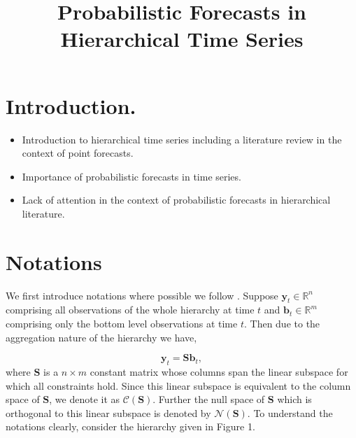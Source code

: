 \documentclass[a4paper, 11pt]{article}
\begin{document}
\title{Probabilistic Forecasts in Hierarchical Time Series}
\maketitle


\section{Introduction.}
\begin{itemize}
	\item Introduction to hierarchical time series including a literature review in the context of point forecasts. 
	\item Importance of probabilistic forecasts in time series.
	\item Lack of attention in the context of probabilistic forecasts in hierarchical literature.
	
\end{itemize}

\section{Notations}
We first introduce notations where possible we follow \citet{Wickramasuriya2017}. Suppose $\mathbold{y}_t \in \bm{\mathbb{R}}^n$ comprising all observations of the whole hierarchy at time $t$ and $\mathbold{b}_t \in \bm{\mathbb{R}}^m$ comprising only the bottom level observations at  time $t$. Then due to the aggregation nature of the hierarchy we have, 

\begin{equation}
\mathbold{y}_t = \mathbold{Sb}_t,
\end{equation}
where $\mathbold{S}$ is a $n \times m$ constant matrix whose columns span the linear subspace for which all constraints hold. Since this linear subspace is equivalent to the column space of $\bm{S}$, we denote it as $\mathscr{C}(\bm{S})$. Further the null space of $\bm{S}$ which is orthogonal to this linear subspace is denoted by $\mathscr{N}(\bm{S})$. 
To understand the notations clearly, consider the hierarchy given in Figure 1.\\
\end{document}
